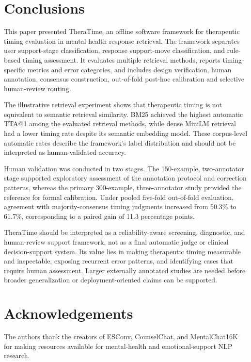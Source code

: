 \documentclass[preprint,12pt,a4paper]{elsarticle}
\begin{document}
\FloatBarrier

\section{Conclusions}
\label{sec:conclusion}

This paper presented TheraTime, an offline software framework for therapeutic timing evaluation in mental-health response retrieval. The framework separates user support-stage classification, response support-move classification, and rule-based timing assessment. It evaluates multiple retrieval methods, reports timing-specific metrics and error categories, and includes design verification, human annotation, consensus construction, out-of-fold post-hoc calibration and selective human-review routing.

The illustrative retrieval experiment shows that therapeutic timing is not equivalent to semantic retrieval similarity. BM25 achieved the highest automatic TTA@1 among the evaluated retrieval methods, while dense MiniLM retrieval had a lower timing rate despite its semantic embedding model. These corpus-level automatic rates describe the framework's label distribution and should not be interpreted as human-validated accuracy.

Human validation was conducted in two stages. The 150-example, two-annotator stage supported exploratory assessment of the annotation protocol and correction patterns, whereas the primary 300-example, three-annotator study provided the reference for formal calibration. Under pooled five-fold out-of-fold evaluation, agreement with majority-consensus timing judgments increased from 50.3\% to 61.7\%, corresponding to a paired gain of 11.3 percentage points.

TheraTime should be interpreted as a reliability-aware screening, diagnostic, and human-review support framework, not as a final automatic judge or clinical decision-support system. Its value lies in making therapeutic timing measurable and inspectable, exposing recurrent error patterns, and identifying cases that require human assessment. Larger externally annotated studies are needed before broader generalization or deployment-oriented claims can be supported.

\section*{Acknowledgements}

The authors thank the creators of ESConv, CounselChat, and MentalChat16K for making resources available for mental-health and emotional-support NLP research.
\end{document}
